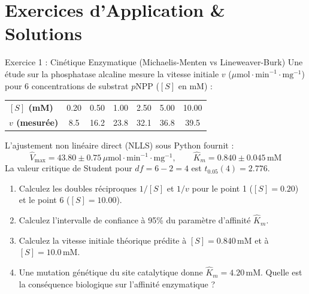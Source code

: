 \documentclass[11pt,a4paper]{article}
\begin{document}
\section{Exercices d'Application \& Solutions}

\begin{exercicebox}{Exercice 1 : Cinétique Enzymatique (Michaelis-Menten vs Lineweaver-Burk)}
Une étude sur la phosphatase alcaline mesure la vitesse initiale $v$ ($\mu\text{mol}\cdot\text{min}^{-1}\cdot\text{mg}^{-1}$) pour 6 concentrations de substrat $p\text{NPP}$ ($[S]$ en mM) :
\begin{center}
\small
\begin{tabular}{lcccccc}
\toprule
\textbf{$[S]$ (mM)} & 0.20 & 0.50 & 1.00 & 2.50 & 5.00 & 10.00 \\
\textbf{$v$ (mesurée)} & 8.5 & 16.2 & 23.8 & 32.1 & 36.8 & 39.5 \\
\bottomrule
\end{tabular}
\end{center}
L'ajustement non linéaire direct (NLLS) sous Python fournit :
\begin{equation*}
  \hat{V}_{\max} = 43.80 \pm 0.75\,\mu\text{mol}\cdot\text{min}^{-1}\cdot\text{mg}^{-1}, \qquad \hat{K}_m = 0.840 \pm 0.045\,\text{mM}
\end{equation*}
La valeur critique de Student pour $df = 6 - 2 = 4$ est $t_{0.05}(4) = 2.776$.
\begin{enumerate}[label=\textbf{\alph*.}]
  \item Calculez les doubles réciproques $1/[S]$ et $1/v$ pour le point 1 ($[S] = 0.20$) et le point 6 ($[S] = 10.00$).
  \item Calculez l'intervalle de confiance à 95\% du paramètre d'affinité $\hat{K}_m$.
  \item Calculez la vitesse initiale théorique prédite à $[S] = 0.840\,\text{mM}$ et à $[S] = 10.0\,\text{mM}$.
  \item Une mutation génétique du site catalytique donne $\hat{K}_m = 4.20\,\text{mM}$. Quelle est la conséquence biologique sur l'affinité enzymatique ?
\end{enumerate}
\end{exercicebox}
\end{document}
